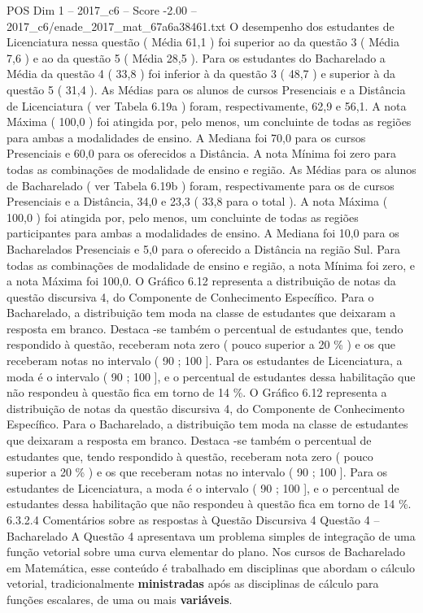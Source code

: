 \begin{textsample}{POS Dim 1 – 2017\_c6 – Score -2.00 – 2017\_c6/enade\_2017\_mat\_67a6a38461.txt}
O desempenho dos estudantes de Licenciatura nessa questão ( Média 61,1 ) foi superior ao da questão 3 ( Média 7,6 ) e ao da questão 5 ( Média 28,5 ).
Para os estudantes do Bacharelado a Média da questão 4 ( 33,8 ) foi inferior à da questão 3 ( 48,7 ) e superior à da questão 5 ( 31,4 ).
As Médias para os alunos de cursos Presenciais e a Distância de Licenciatura ( ver Tabela 6.19a ) foram, respectivamente, 62,9 e 56,1.
A nota Máxima ( 100,0 ) foi atingida por, pelo menos, um concluinte de todas as regiões para ambas a modalidades de ensino.
A Mediana foi 70,0 para os cursos Presenciais e 60,0 para os oferecidos a Distância.
A nota Mínima foi zero para todas as combinações de modalidade de ensino e região.
As Médias para os alunos de Bacharelado ( ver Tabela 6.19b ) foram, respectivamente para os de cursos Presenciais e a Distância, 34,0 e 23,3 ( 33,8 para o total ).
A nota Máxima ( 100,0 ) foi atingida por, pelo menos, um concluinte de todas as regiões participantes para ambas a modalidades de ensino.
A Mediana foi 10,0 para os Bacharelados Presenciais e 5,0 para o oferecido a Distância na região Sul.
Para todas as combinações de modalidade de ensino e região, a nota Mínima foi zero, e a nota Máxima foi 100,0.
O Gráfico 6.12 representa a distribuição de notas da questão discursiva 4, do Componente de Conhecimento Específico.
Para o Bacharelado, a distribuição tem moda na classe de estudantes que deixaram a resposta em branco.
Destaca -se também o percentual de estudantes que, tendo respondido à questão, receberam nota zero ( pouco superior a 20 \% ) e os que receberam notas no intervalo ( 90 ; 100 ].
Para os estudantes de Licenciatura, a moda é o intervalo ( 90 ; 100 ], e o percentual de estudantes dessa habilitação que não respondeu à questão fica em torno de 14 \%.
O Gráfico 6.12 representa a distribuição de notas da questão discursiva 4, do Componente de Conhecimento Específico.
Para o Bacharelado, a distribuição tem moda na classe de estudantes que deixaram a resposta em branco.
Destaca -se também o percentual de estudantes que, tendo respondido à questão, receberam nota zero ( pouco superior a 20 \% ) e os que receberam notas no intervalo ( 90 ; 100 ].
Para os estudantes de Licenciatura, a moda é o intervalo ( 90 ; 100 ], e o percentual de estudantes dessa habilitação que não respondeu à questão fica em torno de 14 \%. 6.3.2.4 Comentários sobre as respostas à Questão Discursiva 4 Questão 4 – Bacharelado A Questão 4 apresentava um problema simples de integração de uma função vetorial sobre uma curva elementar do plano.
Nos cursos de Bacharelado em Matemática, esse conteúdo é trabalhado em disciplinas que abordam o cálculo vetorial, tradicionalmente \textbf{ministradas} após as disciplinas de cálculo para funções escalares, de uma ou mais \textbf{variáveis}.

\end{textsample}
